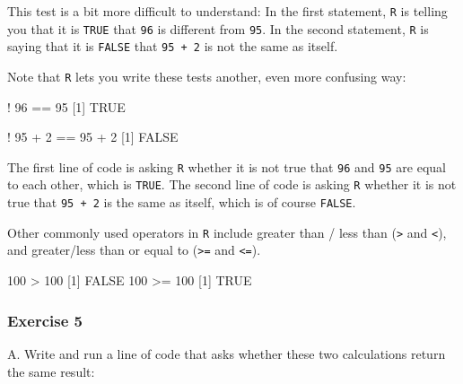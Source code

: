 \documentclass[
]{book}
\newenvironment{Shaded}{\begin{snugshade}}{\end{snugshade}}
\newcommand{\ConstantTok}[1]{\textcolor[rgb]{0.00,0.00,0.00}{#1}}
\newcommand{\DecValTok}[1]{\textcolor[rgb]{0.00,0.00,0.81}{#1}}
\newcommand{\NormalTok}[1]{#1}
\newcommand{\SpecialCharTok}[1]{\textcolor[rgb]{0.00,0.00,0.00}{#1}}
\begin{document}
This test is a bit more difficult to understand: In the first statement, \texttt{R} is telling you that it is \texttt{TRUE} that \texttt{96} is different from \texttt{95}. In the second statement, \texttt{R} is saying that it is \texttt{FALSE} that \texttt{95\ +\ 2} is not the same as itself.

Note that \texttt{R} lets you write these tests another, even more confusing way:

\begin{Shaded}
\begin{Highlighting}[]
\SpecialCharTok{!} \DecValTok{96} \SpecialCharTok{==} \DecValTok{95}
\NormalTok{[}\DecValTok{1}\NormalTok{] }\ConstantTok{TRUE}

\SpecialCharTok{!} \DecValTok{95} \SpecialCharTok{+} \DecValTok{2} \SpecialCharTok{==} \DecValTok{95} \SpecialCharTok{+} \DecValTok{2}
\NormalTok{[}\DecValTok{1}\NormalTok{] }\ConstantTok{FALSE}
\end{Highlighting}
\end{Shaded}

The first line of code is asking \texttt{R} whether it is not true that \texttt{96} and \texttt{95} are equal to each other, which is \texttt{TRUE}. The second line of code is asking \texttt{R} whether it is not true that \texttt{95\ +\ 2} is the same as itself, which is of course \texttt{FALSE}.

Other commonly used operators in \texttt{R} include greater than / less than (\texttt{\textgreater{}} and \texttt{\textless{}}), and greater/less than or equal to (\texttt{\textgreater{}=} and \texttt{\textless{}=}).

\begin{Shaded}
\begin{Highlighting}[]
\DecValTok{100} \SpecialCharTok{\textgreater{}} \DecValTok{100}
\NormalTok{[}\DecValTok{1}\NormalTok{] }\ConstantTok{FALSE}
\DecValTok{100} \SpecialCharTok{\textgreater{}=} \DecValTok{100}
\NormalTok{[}\DecValTok{1}\NormalTok{] }\ConstantTok{TRUE}
\end{Highlighting}
\end{Shaded}

\hypertarget{exercise-5}{%
\subsubsection*{Exercise 5}\label{exercise-5}}

A. Write and run a line of code that asks whether these two calculations return the same result:
\end{document}
